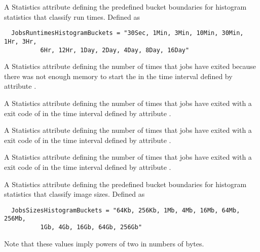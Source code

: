 \begin{description}
\item[\AdAttr{JobsRuntimesHistogramBuckets}:] A Statistics attribute defining
  the predefined bucket boundaries for histogram statistics that
  classify run times.
  Defined as
\footnotesize
\begin{verbatim}
  JobsRuntimesHistogramBuckets = "30Sec, 1Min, 3Min, 10Min, 30Min, 1Hr, 3Hr, 
          6Hr, 12Hr, 1Day, 2Day, 4Day, 8Day, 16Day"
\end{verbatim}
\normalsize

\item[\AdAttr{JobsShadowNoMemory}:]  A Statistics attribute defining
  the number of times that jobs have exited 
  because there was not enough memory to start the 
  in the time interval defined by attribute .

\item[\AdAttr{JobsShouldHold}:]  A Statistics attribute defining
  the number of times that jobs 
  have exited with a  exit code of 
  in the time interval defined by attribute .

\item[\AdAttr{JobsShouldRemove}:]  A Statistics attribute defining
  the number of times that jobs 
  have exited with a  exit code of 
  in the time interval defined by attribute .

\item[\AdAttr{JobsShouldRequeue}:]  A Statistics attribute defining
  the number of times that jobs 
  have exited with a  exit code of 
  in the time interval defined by attribute .

\item[\AdAttr{JobsSizesHistogramBuckets}:] A Statistics attribute defining
  the predefined bucket boundaries for histogram statistics that
  classify image sizes.
  Defined as
\footnotesize
\begin{verbatim}
  JobsSizesHistogramBuckets = "64Kb, 256Kb, 1Mb, 4Mb, 16Mb, 64Mb, 256Mb,
          1Gb, 4Gb, 16Gb, 64Gb, 256Gb"
\end{verbatim}
\normalsize
  Note that these values imply powers of two in numbers of bytes.


\end{description}
